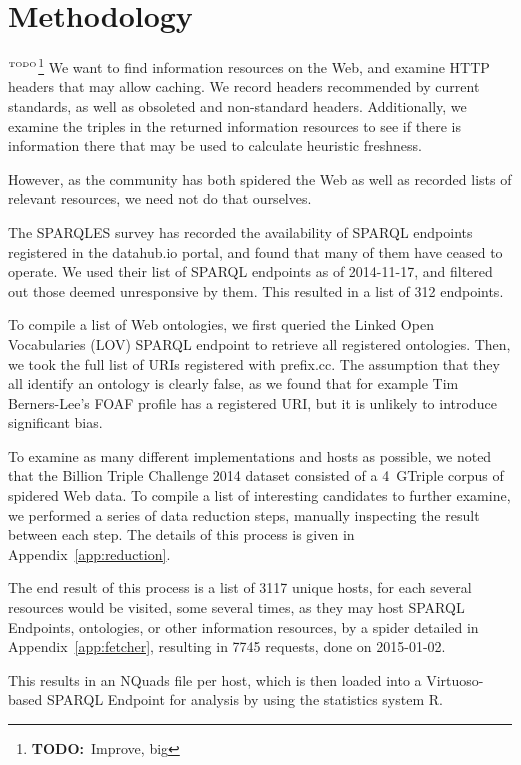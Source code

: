 \documentclass{llncs}
\newcommand{\todo}[1]{\ensuremath{^{\textrm{\tiny{TODO}\normalsize}}}\footnote{\textbf{TODO:}~#1}}
\begin{document}
\section{Methodology}
\todo{Improve, big}
We want to find information resources on the Web, and examine HTTP
headers that may allow caching. We record headers recommended by
current standards, as well as obsoleted and non-standard
headers. Additionally, we examine the triples in the returned
information resources to see if there is information there that may be
used to calculate heuristic freshness.

However, as the community has both spidered the Web as well as
recorded lists of relevant resources, we need not do that ourselves. 

The SPARQLES survey\cite{buil2013sparql} has recorded the availability
of SPARQL endpoints registered in the datahub.io portal, and found
that many of them have ceased to operate. We used their list of SPARQL
endpoints as of 2014-11-17, and filtered out those deemed unresponsive
by them. This resulted in a list of 312 endpoints.

To compile a list of Web ontologies, we first queried the Linked Open
Vocabularies (LOV) \cite{lov2} SPARQL endpoint
to retrieve all registered ontologies. Then, we took the full list of
URIs registered with prefix.cc. The assumption that they all identify
an ontology is clearly false, as we found that for example Tim
Berners-Lee's FOAF profile has a registered URI, but it is unlikely to
introduce significant bias.

To examine as many different implementations and hosts as possible, we
noted that the Billion Triple Challenge 2014 \cite{btc-2014} dataset
consisted of a 4~GTriple corpus of spidered Web data. To compile a
list of interesting candidates to further examine, we performed a
series of data reduction steps, manually inspecting the result between
each step. The details of this process is given in
Appendix~\ref{app:reduction}.

The end result of this process is a list of 3117 unique hosts, for
each several resources would be visited, some several times, as they
may host SPARQL Endpoints, ontologies, or other information resources,
by a spider detailed in Appendix~\ref{app:fetcher}, resulting in 7745
requests, done on 2015-01-02.

This results in an NQuads file per host, which is then loaded into a
Virtuoso-based SPARQL Endpoint for analysis by using the statistics
system R\cite{kn:r}.
\end{document}
